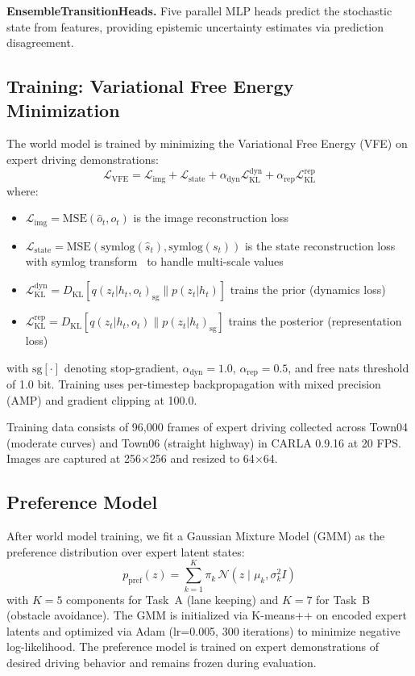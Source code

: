 \documentclass[conference]{IEEEtran}
\begin{document}
\textbf{EnsembleTransitionHeads.} Five parallel MLP heads predict the stochastic state from features, providing epistemic uncertainty estimates via prediction disagreement.

\subsection{Training: Variational Free Energy Minimization}

The world model is trained by minimizing the Variational Free Energy (VFE) on expert driving demonstrations:
\begin{equation}
    \mathcal{L}_{\text{VFE}} = \mathcal{L}_{\text{img}} + \mathcal{L}_{\text{state}} + \alpha_{\text{dyn}} \mathcal{L}_{\text{KL}}^{\text{dyn}} + \alpha_{\text{rep}} \mathcal{L}_{\text{KL}}^{\text{rep}}
\label{eq:vfe_loss}
\end{equation}
where:
\begin{itemize}
    \item $\mathcal{L}_{\text{img}} = \text{MSE}(\hat{o}_t, o_t)$ is the image reconstruction loss
    \item $\mathcal{L}_{\text{state}} = \text{MSE}(\text{symlog}(\hat{s}_t), \text{symlog}(s_t))$ is the state reconstruction loss with symlog transform~\cite{hafner2023mastering} to handle multi-scale values
    \item $\mathcal{L}_{\text{KL}}^{\text{dyn}} = D_{\text{KL}}[q(z_t | h_t, o_t)_{\text{sg}} \| p(z_t | h_t)]$ trains the prior (dynamics loss)
    \item $\mathcal{L}_{\text{KL}}^{\text{rep}} = D_{\text{KL}}[q(z_t | h_t, o_t) \| p(z_t | h_t)_{\text{sg}}]$ trains the posterior (representation loss)
\end{itemize}
with $\text{sg}[\cdot]$ denoting stop-gradient, $\alpha_{\text{dyn}} = 1.0$, $\alpha_{\text{rep}} = 0.5$, and free nats threshold of 1.0 bit. Training uses per-timestep backpropagation with mixed precision (AMP) and gradient clipping at 100.0.

Training data consists of 96,000 frames of expert driving collected across Town04 (moderate curves) and Town06 (straight highway) in CARLA 0.9.16 at 20 FPS. Images are captured at 256$\times$256 and resized to 64$\times$64.

\subsection{Preference Model}

After world model training, we fit a Gaussian Mixture Model (GMM) as the preference distribution over expert latent states:
\begin{equation}
    p_{\text{pref}}(z) = \sum_{k=1}^{K} \pi_k \, \mathcal{N}(z \mid \mu_k, \sigma_k^2 I)
\end{equation}
with $K{=}5$ components for Task~A (lane keeping) and $K{=}7$ for Task~B (obstacle avoidance). The GMM is initialized via K-means++ on encoded expert latents and optimized via Adam (lr=0.005, 300 iterations) to minimize negative log-likelihood. The preference model is trained on expert demonstrations of desired driving behavior and remains frozen during evaluation.
\end{document}
